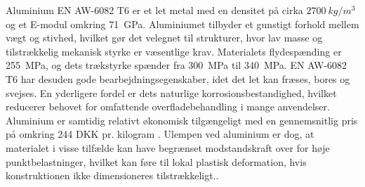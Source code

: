 Aluminium EN AW-6082 T6 er et let metal med en densitet på cirka \(\SI{2700}{kg/m^3}\) og et E-modul omkring \SI{71}{GPa}. Aluminiumet tilbyder et gunstigt forhold mellem vægt og stivhed, hvilket gør det velegnet til strukturer, hvor lav masse og tilstrækkelig mekanisk styrke er væsentlige krav. Materialets flydespænding er \SI{255}{MPa}, og dets trækstyrke spænder fra \SI{300}{MPa} til \SI{340}{MPa}. EN AW-6082 T6 har desuden gode bearbejdningsegenskaber, idet det let kan fræses, bores og svejses. En yderligere fordel er dets naturlige korrosionsbestandighed, hvilket reducerer behovet for omfattende overfladebehandling i mange anvendelser. Aluminium er samtidig relativt økonomisk tilgængeligt med en gennemsnitlig pris på omkring 244 DKK pr. kilogram \parencite{Aluminiumplade}. Ulempen ved aluminium er dog, at materialet i visse tilfælde kan have begrænset modstandskraft over for høje punktbelastninger, hvilket kan føre til lokal plastisk deformation, hvis konstruktionen ikke dimensioneres tilstrækkeligt.\parencite{Hesse2011AluminiumSheets}.




